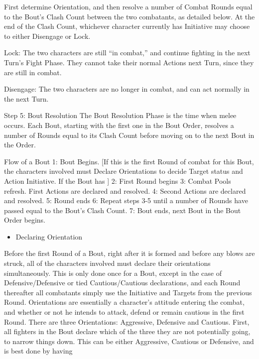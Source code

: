 \documentclass[oneside,11pt,english]{book}
\begin{document}
 

First determine Orientation, and then resolve a number of Combat Rounds equal to the Bout's 
Clash Count between the two combatants, as detailed below. At the end of the Clash Count, 
whichever character currently has Initiative may choose to either Disengage or Lock. 

 

Lock: The two characters are still “in combat,” and continue fighting in the next Turn's 
Fight Phase. They cannot take their normal Actions next Turn, since they are still in 
combat. 

 

Disengage: The two characters are no longer in combat, and can act normally in the next 
Turn. 

 
Step 5: Bout Resolution 
The Bout Resolution Phase is the time when melee occurs. Each Bout, starting with the first one in the 
Bout Order, resolves a number of Rounds equal to its Clash Count before moving on to the next Bout in 
the Order. 


Flow of a Bout 
1: Bout Begins. [If this is the first Round of combat for this Bout, the characters involved must 
Declare Orientations to decide Target status and Action Initiative. If the Bout has ] 
2: First Round begins 
3: Combat Pools refresh. First Actions are declared and resolved. 
4: Second Actions are declared and resolved. 
5: Round ends 
6: Repeat steps 3-5 until a number of Rounds have passed equal to the Bout’s Clash Count. 
7: Bout ends, next Bout in the Bout Order begins. 

 
\begin{itemize}
\item Declaring Orientation 
\end{itemize}
Before the first Round of a Bout, right after it is formed and before any blows are struck, all of 
the characters involved must declare their orientations simultaneously. This is only done once for 
a Bout, except in the case of Defensive/Defensive or tied Cautious/Cautious declarations, and 
each Round thereafter all combatants simply use the Initiative and Targets from the previous 
Round. 
Orientations are essentially a character’s attitude entering the combat, and whether or not he 
intends to attack, defend or remain cautious in the first Round. There are three Orientations: 
Aggressive, Defensive and Cautious. 
First, all fighters in the Bout declare which of the three they are not potentially going, to narrow 
things down. This can be either Aggressive, Cautious or Defensive, and is best done by having 
\end{document}
